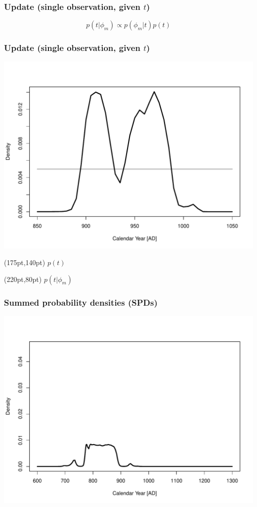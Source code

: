 \documentclass{beamer}
\begin{document}
\begin{frame}[t]
  \frametitle{Update (single observation, given $t$)}
  \Large
  \begin{equation}
    p(t|\phi_m) \propto p(\phi_m|t) p(t)
  \end{equation}
  \normalsize
\end{frame}

\begin{frame}[t]
  \frametitle{Update (single observation, given $t$)}
    \includegraphics[height=.85\textheight]{single_obs_inf_plot3.pdf}
    \begin{textblock*}{100pt}(175pt,140pt)
      \Large $p(t)$ \normalsize
	\end{textblock*}
    \begin{textblock*}{100pt}(220pt,80pt)
      \Large $p(t|\phi_m)$ \normalsize
	\end{textblock*}
\end{frame}

\begin{frame}[t]
  \frametitle{Summed probability densities (SPDs)}
    \includegraphics[height=.85\textheight]{spd1.pdf}
\end{frame}
\end{document}
